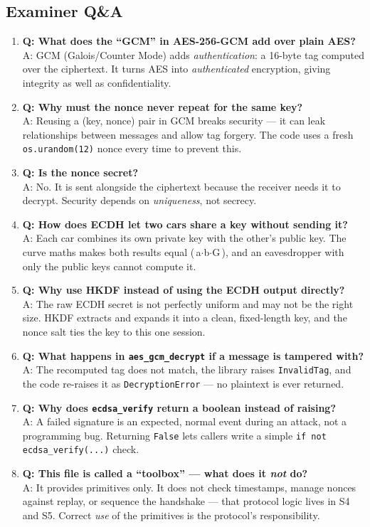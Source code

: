 \documentclass[11pt,a4paper]{article}
\begin{document}
\subsection{Examiner Q\&A}
\begin{enumerate}
  \item \textbf{Q: What does the ``GCM'' in AES-256-GCM add over plain AES?}\\
        A: GCM (Galois/Counter Mode) adds \emph{authentication}: a 16-byte tag
        computed over the ciphertext. It turns AES into \emph{authenticated}
        encryption, giving integrity as well as confidentiality.
  \item \textbf{Q: Why must the nonce never repeat for the same key?}\\
        A: Reusing a (key, nonce) pair in GCM breaks security --- it can leak
        relationships between messages and allow tag forgery. The code uses a
        fresh \texttt{os.urandom(12)} nonce every time to prevent this.
  \item \textbf{Q: Is the nonce secret?}\\
        A: No. It is sent alongside the ciphertext because the receiver needs it
        to decrypt. Security depends on \emph{uniqueness}, not secrecy.
  \item \textbf{Q: How does ECDH let two cars share a key without sending it?}\\
        A: Each car combines its own private key with the other's public key.
        The curve maths makes both results equal (\,a$\cdot$b$\cdot$G\,), and an
        eavesdropper with only the public keys cannot compute it.
  \item \textbf{Q: Why use HKDF instead of using the ECDH output directly?}\\
        A: The raw ECDH secret is not perfectly uniform and may not be the right
        size. HKDF extracts and expands it into a clean, fixed-length key, and
        the nonce salt ties the key to this one session.
  \item \textbf{Q: What happens in \texttt{aes\_gcm\_decrypt} if a message is
        tampered with?}\\
        A: The recomputed tag does not match, the library raises
        \texttt{InvalidTag}, and the code re-raises it as \texttt{DecryptionError}
        --- no plaintext is ever returned.
  \item \textbf{Q: Why does \texttt{ecdsa\_verify} return a boolean instead of
        raising?}\\
        A: A failed signature is an expected, normal event during an attack, not
        a programming bug. Returning \texttt{False} lets callers write a simple
        \texttt{if not ecdsa\_verify(...)} check.
  \item \textbf{Q: This file is called a ``toolbox'' --- what does it \emph{not}
        do?}\\
        A: It provides primitives only. It does not check timestamps, manage
        nonces against replay, or sequence the handshake --- that protocol logic
        lives in S4 and S5. Correct \emph{use} of the primitives is the
        protocol's responsibility.
\end{enumerate}
\end{document}

